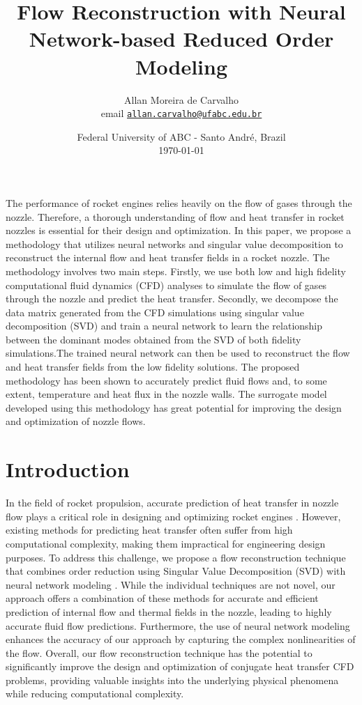 \documentclass[10pt,oneside,a4paper,twocolumn]{article}
\title{Flow Reconstruction with Neural Network-based Reduced Order Modeling}
\author{Allan Moreira de Carvalho \\ email \href{mailto:properallan@gmail.com}{\texttt{allan.carvalho@ufabc.edu.br}}}
\date{Federal University of ABC - Santo André, Brazil \\ \today}
\begin{document}
\maketitle

\abstract

The performance of rocket engines relies heavily on the flow of gases through the nozzle. Therefore, a thorough understanding of flow and heat transfer in rocket nozzles is essential for their design and optimization. In this paper, we propose a methodology that utilizes neural networks and singular value decomposition to reconstruct the internal flow and heat transfer fields in a rocket nozzle.
The methodology involves two main steps. Firstly, we use both low and high fidelity computational fluid dynamics (CFD) analyses to simulate the flow of gases through the nozzle and predict the heat transfer. Secondly, we decompose the data matrix generated from the CFD simulations using singular value decomposition (SVD) and train a neural network to learn the relationship between the dominant modes obtained from the SVD of both fidelity simulations.The trained neural network can then be used to reconstruct the flow and heat transfer fields from the low fidelity solutions. The proposed methodology has been shown to accurately predict fluid flows and, to some extent, temperature and heat flux in the nozzle walls. The surrogate model developed using this methodology has great potential for improving the design and optimization of nozzle flows.

\section{Introduction}

In the field of rocket propulsion, accurate prediction of heat transfer in nozzle flow plays a critical role in designing and optimizing rocket engines \cite{Zhang2011}. However, existing methods for predicting heat transfer often suffer from high computational complexity, making them impractical for engineering design purposes. To address this challenge, we propose a flow reconstruction \cite{Lui2019,Yu2019} technique that combines order reduction using Singular Value Decomposition (SVD)\cite{Golub2013-ag} with neural network modeling \cite{Brunton2019-ax}. While the individual techniques are not novel, our approach offers a combination of these methods for accurate and efficient prediction of internal flow and thermal fields in the nozzle, leading to highly accurate fluid flow predictions. Furthermore, the use of neural network modeling enhances the accuracy of our approach by capturing the complex nonlinearities of the flow. Overall, our flow reconstruction technique has the potential to significantly improve the design and optimization of conjugate heat transfer CFD problems, providing valuable insights into the underlying physical phenomena while reducing computational complexity.
\end{document}
